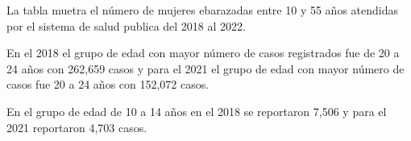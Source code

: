 La tabla muetra el número de mujeres ebarazadas entre 10 y 55 años atendidas por el sistema de salud publica del 2018 al 2022. 

En el 2018 el grupo de edad con mayor número de casos registrados fue de 20 a 24 años con 262,659 casos y para el 2021 el grupo de edad con mayor número de casos fue 20 a 24 años con 152,072 casos. 

En el grupo de edad de 10 a 14 años en el 2018 se reportaron 7,506 y para el 2021 reportaron 4,703 casos. 

